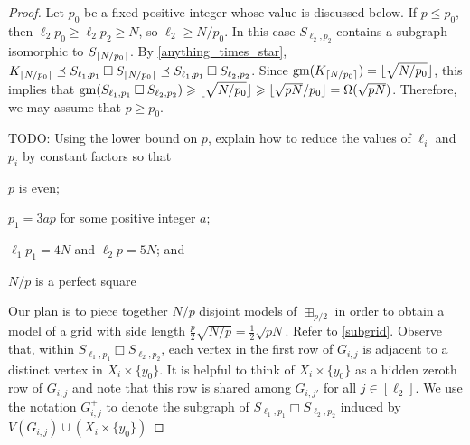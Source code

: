 \documentclass[12pt]{article}
\newcommand{\boxprod}{\mathbin{\Box}}
\DeclarePairedDelimiter{\floor}{\lfloor}{\rfloor}
\DeclarePairedDelimiter{\ceil}{\lceil}{\rceil}
\renewcommand{\ge}{\geqslant}
\renewcommand{\le}{\leqslant}
\DeclareMathOperator{\gm}{gm}
\newcommand{\PP}{\mathcal{P}}
\theoremstyle{plain}
\theoremstyle{definition}
\begin{document}
\begin{proof}
  Let $p_0$ be a fixed positive integer whose value is discussed below. If $p \le p_0$, then $\ell_2 p_0 \ge \ell_2 p_2 \ge N$, so $\ell_2\ge N/p_0$.  In this case $S_{\ell_2,p_2}$ contains a subgraph isomorphic to $S_{\ceil{N/p_0}}$.  By \cref{anything_times_star}, $K_{\ceil{N/p_0}}\preceq S_{\ell_1,p_1}\boxprod S_{\ceil{N/p_0}} \preceq S_{\ell_1,p_1}\boxprod S_{\ell_2,p_2}$.  Since $\gm(K_{\ceil{N/p_0}}) = \floor{\sqrt{N/p_0}}$, this implies that $\gm(S_{\ell_1,p_1}\boxprod S_{\ell_2,p_2}) \ge \floor{\sqrt{N/p_0}}\ge \floor{\sqrt{pN}/p_0}=\Omega(\sqrt{pN})$.  Therefore, we may assume that $p\ge p_0$.

  TODO: Using the lower bound on $p$, explain how to reduce the values of $\ell_i$ and $p_i$ by constant factors so that
   \begin{compactenum}
     \item $p$ is even;
     \item $p_1 = 3ap$ for some positive integer $a$;
     \item $\ell_1p_1 = 4N$ and $\ell_2 p=5N$; and
     \item $N/p$ is a perfect square
   \end{compactenum}


  Our plan is to piece together $N/p$ disjoint models of $\boxplus_{p/2}$ in order to obtain a model of a grid with side length $\tfrac{p}{2}\sqrt{N/p}=\tfrac{1}{2}\sqrt{pN}$.  Refer to \cref{subgrid}.  Observe that, within $S_{\ell_1,p_1}\boxprod S_{\ell_2,p_2}$, each vertex in the first row of $G_{i,j}$ is adjacent to a distinct vertex in $X_i\times\{y_0\}$. It is helpful to think of $X_i\times\{y_0\}$ as a hidden zeroth row of $G_{i,j}$ and note that this row is shared among $G_{i,j'}$ for all $j\in[\ell_2]$.  We use the notation $G_{i,j}^+$ to denote the subgraph of $S_{\ell_1,p_1}\boxprod S_{\ell_2,p_2}$ induced by $V(G_{i,j})\cup (X_i\times\{y_0\})$


\end{proof}
\end{document}
